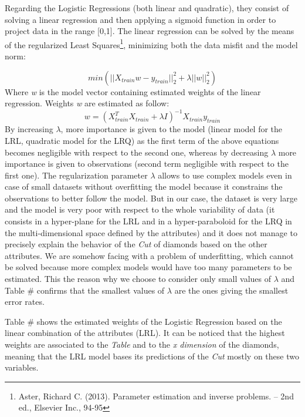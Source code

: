 \documentclass[
]{article}
\begin{document}
Regarding the Logistic Regressions (both linear and quadratic), they
consist of solving a linear regression and then applying a sigmoid
function in order to project data in the range {[}0,1{]}. The linear
regression can be solved by the means of the regularized Least
Squares\footnote{Aster, Richard C. (2013). Parameter estimation and
  inverse problems. -- 2nd ed., Elsevier Inc., 94-95}, minimizing both
the data misfit and the model norm:

\[
min(||X_{train}w-y_{train}||^2_2+\lambda||w||^2_2)
\] Where \emph{w} is the model vector containing estimated weights of
the linear regression. Weights \emph{w} are estimated as follow: \[
w=(X_{train}^T X_{train}+\lambda I)^{-1}X_{train}y_{train}
\] By increasing \(\lambda\), more importance is given to the model
(linear model for the LRL, quadratic model for the LRQ) as the first
term of the above equations becomes negligible with respect to the
second one, whereas by decreasing \(\lambda\) more importance is given
to observations (second term negligible with respect to the first one).
The regularization parameter \(\lambda\) allows to use complex models
even in case of small datasets without overfitting the model because it
constrains the observations to better follow the model. But in our case,
the dataset is very large and the model is very poor with respect to the
whole variability of data (it consists in a hyper-plane for the LRL and
in a hyper-paraboloid for the LRQ in the multi-dimensional space defined
by the attributes) and it does not manage to precisely explain the
behavior of the \emph{Cut} of diamonds based on the other attributes. We
are somehow facing with a problem of underfitting, which cannot be
solved because more complex models would have too many parameters to be
estimated. This the reason why we choose to consider only small values
of \(\lambda\) and Table \# confirms that the smallest values of
\(\lambda\) are the ones giving the smallest error rates.

Table \# shows the estimated weights of the Logistic Regression based on
the linear combination of the attributes (LRL). It can be noticed that
the highest weights are associated to the \emph{Table} and to the
\emph{x dimension} of the diamonds, meaning that the LRL model bases its
predictions of the \emph{Cut} mostly on these two variables.
\end{document}
